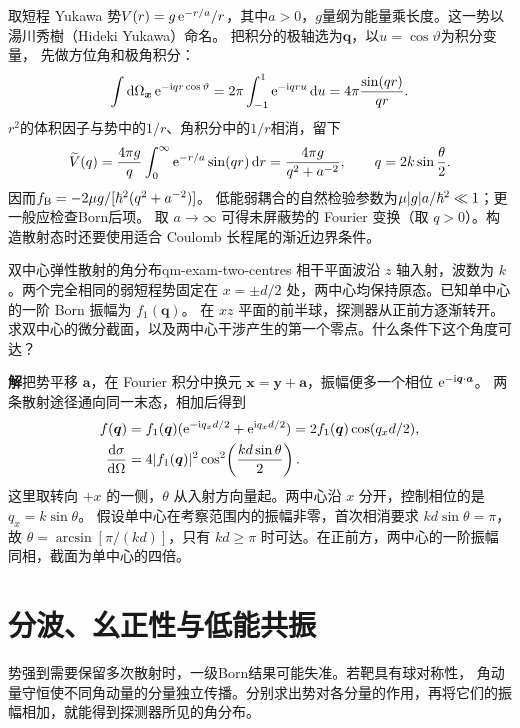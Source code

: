 取短程 Yukawa 势$V(r) = g\mathop{}\!\mathrm{e}^{-r/a}/r$，其中$a > 0$，$g$量纲为能量乘长度。这一势以湯川秀樹（Hideki Yukawa）命名。
把积分的极轴选为$\bm q$，以$u = \cos\vartheta$为积分变量，
先做方位角和极角积分：
\begin{equation}
    \int\mathop{}\!\mathrm{d}\Omega_{\bm x}\mathop{}\!\mathrm{e}^{-\mathrm{i} qr\cos\vartheta}
    = 2\pi\int_{-1}^{1}\mathop{}\!\mathrm{e}^{-\mathrm{i} qru}\mathop{}\!\mathrm{d} u
    = 4\pi\frac{\sin(qr)}{qr}.
\end{equation}
$r^2$的体积因子与势中的$1/r$、角积分中的$1/r$相消，留下
\begin{equation}
    \widetilde V(q) = \frac{4\pi g}{q}\int_0^\infty\mathop{}\!\mathrm{e}^{-r/a}\sin(qr)\mathop{}\!\mathrm{d} r
    = \frac{4\pi g}{q^2 + a^{-2}},\qquad q = 2k\sin\frac\theta2.
\end{equation}
因而$f_{\mathrm{B}} = -2\mu g/[\hbar^2(q^2 + a^{-2})]$。
低能弱耦合的自然检验参数为$\mu\lvert g\rvert a/\hbar^2 \ll 1$；更一般应检查Born后项。
取 $a \to \infty$ 可得未屏蔽势的 Fourier 变换（取 $q > 0$）。构造散射态时还要使用适合 Coulomb 长程尾的渐近边界条件。

\begin{example}{双中心弹性散射的角分布}{qm-exam-two-centres}
    相干平面波沿 $z$ 轴入射，波数为 $k$。两个完全相同的弱短程势固定在 $x = \pm d/2$ 处，两中心均保持原态。已知单中心的一阶 Born 振幅为 $f_1(\bm q)$。
    在 $xz$ 平面的前半球，探测器从正前方逐渐转开。求双中心的微分截面，以及两中心干涉产生的第一个零点。什么条件下这个角度可达？

    \par\smallskip\textbf{解}\quad 把势平移 $\bm a$，在 Fourier 积分中换元 $\bm x = \bm y + \bm a$，振幅便多一个相位 $\mathop{}\!\mathrm{e}^{-\mathrm{i}\bm q\cdot\bm a}$。
    两条散射途径通向同一末态，相加后得到
    \begin{align*}
        f(\bm q) &= f_1(\bm q)(\mathop{}\!\mathrm{e}^{-\mathrm{i} q_xd/2} + \mathop{}\!\mathrm{e}^{\mathrm{i} q_xd/2})
                  = 2 f_1(\bm q)\cos(q_xd/2),\\
        \frac{\mathop{}\!\mathrm{d}\sigma}{\mathrm{d}\Omega}
                 &= 4\lvert f_1(\bm q)\rvert^2\cos^2\!\left(\frac{kd\sin\theta}{2}\right).
    \end{align*}
    这里取转向 $+x$ 的一侧，$\theta$ 从入射方向量起。两中心沿 $x$ 分开，控制相位的是 $q_x = k\sin\theta$。
    假设单中心在考察范围内的振幅非零，首次相消要求 $kd\sin\theta = \pi$，故 $\theta = \arcsin[\pi/(kd)]$，只有 $kd \geq \pi$ 时可达。在正前方，两中心的一阶振幅同相，截面为单中心的四倍。
\end{example}

\section{分波、幺正性与低能共振}
势强到需要保留多次散射时，一级Born结果可能失准。若靶具有球对称性，
角动量守恒使不同角动量的分量独立传播。分别求出势对各分量的作用，再将它们的振幅相加，就能得到探测器所见的角分布。

